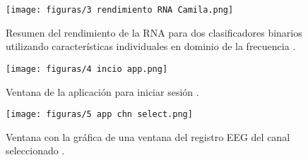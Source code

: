 \begin{figure}[t]
    \centering
    \texttt{[image: figuras/3 rendimiento RNA Camila.png]}
    \caption{Resumen del rendimiento de la RNA para dos clasificadores binarios utilizando características individuales en dominio de la frecuencia \cite{camila_2022}.}
    \label{fig:camila_tabla_res1}
\end{figure}

\begin{figure}[t]
    \centering
    \texttt{[image: figuras/4 incio app.png]}
    \caption{Ventana de la aplicación para iniciar sesión \cite{david_2022}.}
    \label{fig:app_ini}
\end{figure}

\begin{figure}[ht]
    \centering
    \texttt{[image: figuras/5 app chn select.png]}
    \caption{Ventana con la gráfica de una ventana del registro EEG del canal seleccionado \cite{david_2022}.}
    \label{fig:app_chn_slct}
\end{figure}

